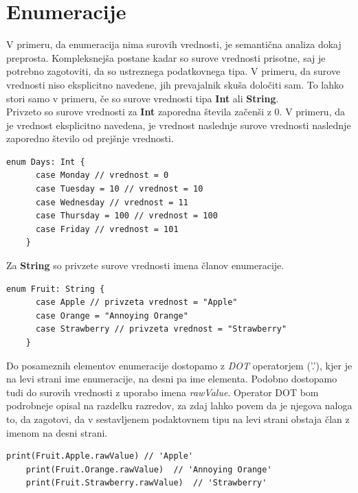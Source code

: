 \documentclass[a4paper, 12p]{book}
\begin{document}
\section{Enumeracije}

V primeru, da enumeracija nima surovih vrednosti, je semantična analiza dokaj preprosta. Kompleksnejša postane kadar so surove vrednosti prisotne, saj je potrebno zagotoviti, da so ustreznega podatkovnega tipa. V primeru, da surove vrednosti niso eksplicitno navedene, jih prevajalnik skuša določiti sam. To lahko stori samo v primeru, če so surove vrednosti tipa \textbf{Int} ali \textbf{String}. \\
\indent Privzeto so surove vrednosti za \textbf{Int} zaporedna števila začenši z 0. V primeru, da je vrednost eksplicitno navedena, je vrednost naslednje surove vrednosti naslednje zaporedno število od prejšnje vrednosti.

\begin{lstlisting}[caption={Enumeracija s surovimi vrednostmi tipa Int}, captionpos=b]
	enum Days: Int {
	  case Monday // vrednost = 0
	  case Tuesday = 10 // vrednost = 10
	  case Wednesday // vrednost = 11
	  case Thursday = 100 // vrednost = 100
	  case Friday // vrednost = 101
	}
\end{lstlisting}

\indent Za \textbf{String} so privzete surove vrednosti imena članov enumeracije.

\begin{lstlisting}[caption={Enumeracija s surovimi vrednostmi tipa String}, captionpos=b, label={lst:fruitEnumeration}]
	enum Fruit: String {
	  case Apple // privzeta vrednost = "Apple"
	  case Orange = "Annoying Orange"
	  case Strawberry // privzeta vrednost = "Strawberry"
	}
\end{lstlisting}

Do posameznih elementov enumeracije dostopamo z \textit{DOT} operatorjem ('.'), kjer je na levi strani ime enumeracije, na desni pa ime elementa. Podobno dostopamo tudi do surovih vrednosti z uporabo imena \textit{rawValue}. Operator DOT bom podrobneje opisal na razdelku razredov, za zdaj lahko povem da je njegova naloga to, da zagotovi, da v sestavljenem podaktovnem tipu na levi strani obstaja član z imenom na desni strani.

\begin{lstlisting}[caption={Primer dostopa do elementov enumeracije ~\ref{lst:fruitEnumeration}}, captionpos=b]
	print(Fruit.Apple.rawValue) // 'Apple'
	print(Fruit.Orange.rawValue)  // 'Annoying Orange'
	print(Fruit.Strawberry.rawValue)  // 'Strawberry'
\end{lstlisting}
\end{document}
